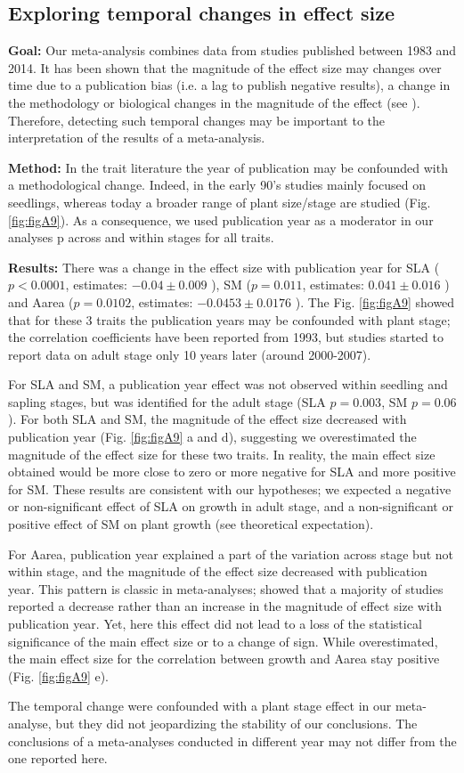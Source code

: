 \documentclass[a4paper]{article}\usepackage[]{graphicx}\usepackage[]{color}
\begin{document}
\begin{appendices}
\subsection{Exploring temporal changes in effect size}
\textbf{Goal:} Our meta-analysis combines data from studies published between 1983 and 2014. It has been shown that the magnitude of the effect size may changes over time due to a publication bias (i.e. a lag to publish negative results), a change in the methodology or biological changes in the magnitude of the effect (see \citealt{Koricheva:2013hy}). Therefore, detecting such temporal changes may be important to the interpretation of the results of a meta-analysis.

\textbf{Method:} In the trait literature the year of publication may be confounded with a methodological change. Indeed, in the early 90’s studies mainly focused on seedlings, whereas today a broader range of plant size/stage are studied (Fig. \ref{fig:figA9}). As a consequence, we used publication year as a moderator in our analyses \citep{Zvereva:2008jm}p across and within stages for all traits.

\textbf{Results:} There was a change in the effect size with publication year for SLA ($p<0.0001$, estimates: $-0.04 \pm 0.009$ ), SM ($p = 0.011$, estimates: $0.041 \pm 0.016$ ) and Aarea ($p = 0.0102$, estimates: $-0.0453 \pm 0.0176$ ). The Fig. \ref{fig:figA9} showed that for these 3 traits the publication years may be confounded with plant stage; the correlation coefficients have been reported from 1993, but studies started to report data on adult stage only 10 years later (around 2000-2007).

For SLA and SM, a publication year effect was not observed within seedling and sapling stages, but was identified for the adult stage (SLA $p = 0.003$, SM $p = 0.06$). For both SLA and SM, the magnitude of the effect size decreased with publication year (Fig. \ref{fig:figA9} a and d), suggesting we overestimated the magnitude of the effect size for these two traits.  In reality, the main effect size obtained would be more close to zero or more negative for SLA and more positive for SM. These results are consistent with our hypotheses; we expected a negative or non-significant effect of SLA on growth in adult stage, and a non-significant or positive effect of SM on plant growth (see theoretical expectation).

For Aarea, publication year explained a part of the variation across stage but not within stage, and the magnitude of the effect size decreased with publication year. This pattern is classic in meta-analyses; \citealt{Koricheva:2013hy} showed that a majority of studies reported a decrease rather than an increase in the magnitude of effect size with publication year.  Yet, here this effect did not lead to a loss of the statistical significance of the main effect size or to a change of sign. While overestimated, the main effect size for the correlation between growth and Aarea stay positive  (Fig. \ref{fig:figA9} e).

The temporal change were confounded with a plant stage effect in our meta-analyse, but they did not jeopardizing the stability of our conclusions. The conclusions of a meta-analyses conducted in different year may not differ from the one reported here.


\end{appendices}
\end{document}
